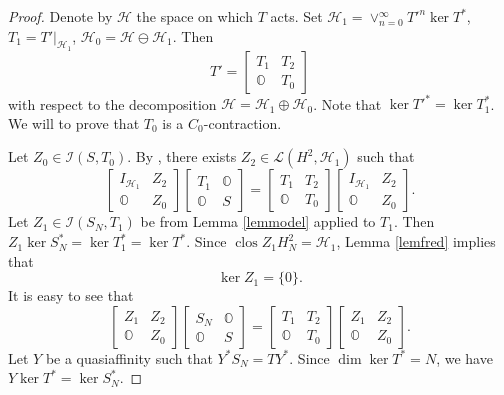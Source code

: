 \documentclass[a4paper,oneside,11pt]{amsart}
\numberwithin{equation}{section}
\theoremstyle{plain}
\theoremstyle{definition}
\begin{document}
\begin{proof} Denote by $\mathcal H$ the space on which $T$ acts.  Set $\mathcal H_1= \vee_{n=0}^\infty T'^n\ker T^*$,  $T_1=T'|_{\mathcal H_1}$, 
$\mathcal H_0=\mathcal H\ominus\mathcal H_1$. Then 
\begin{equation*} T'=\left[\begin{matrix}T_1 & T_2 \\ \mathbb O & T_0\end{matrix}\right]
\end{equation*}
with respect to the decomposition $\mathcal H=\mathcal H_1\oplus\mathcal H_0$. Note that $\ker T'^*=\ker T_1^*$. 
We will to prove that $T_0$ is a $C_0$-contraction. 

Let $Z_0\in\mathcal  I(S, T_0)$.  
By {\cite[Lemma 1]{takshiftindex}}, there exists $Z_2\in\mathcal  L(H^2,\mathcal H_1)$ 
such that  \begin{equation*} \left[\begin{matrix}I_{\mathcal H_1} & Z_2 \\ \mathbb O & Z_0\end{matrix}\right]
\left[\begin{matrix}T_1 & \mathbb O \\ \mathbb O & S\end{matrix}\right] = 
\left[\begin{matrix}T_1 & T_2 \\ \mathbb O & T_0\end{matrix}\right]
\left[\begin{matrix}I_{\mathcal H_1} & Z_2 \\ \mathbb O & Z_0\end{matrix}\right].
\end{equation*}
Let $Z_1\in\mathcal  I(S_N, T_1)$ be from Lemma \ref{lemmodel} applied to $T_1$. Then $Z_1\ker S_N^*=\ker T_1^*=\ker T^*$. 
 Since $\operatorname{clos}Z_1H^2_N=\mathcal H_1$, 
 Lemma \ref{lemfred} implies that  
\begin{equation}\label{kerzz1} \ker Z_1=\{0\}.
\end{equation}  
It is easy to see that  \begin{equation*} \left[\begin{matrix}Z_1 & Z_2 \\ \mathbb O & Z_0\end{matrix}\right]
\left[\begin{matrix}S_N & \mathbb O \\ \mathbb O & S\end{matrix}\right] = 
\left[\begin{matrix}T_1 & T_2 \\ \mathbb O & T_0\end{matrix}\right]
\left[\begin{matrix}Z_1 & Z_2 \\ \mathbb O & Z_0\end{matrix}\right].\end{equation*}
Let $Y$ be a quasiaffinity such that $Y^*S_N=TY^*$.
 Since $\dim\ker T^*=N$, we have $Y\ker T^*=\ker S_N^*$. 


\end{proof}
\end{document}
